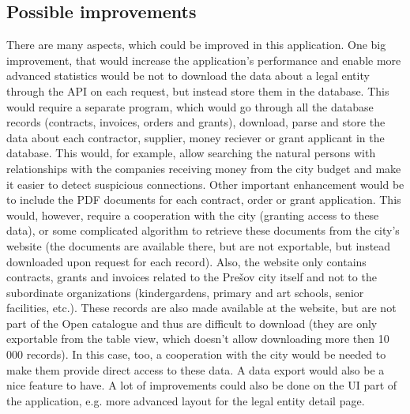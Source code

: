 \documentclass[thesis=B,english]{FITthesis}[2012/06/26]
\begin{document}
{	\subsection{Possible improvements}
	There are many aspects, which could be improved in this application. One big improvement, that would increase the application's performance and enable more advanced statistics would be not to download the data about a legal entity through the API on each request, but instead store them in the database. This would require a separate program, which would go through all the database records (contracts, invoices, orders and grants), download, parse and store the data about each contractor, supplier, money reciever or grant applicant in the database. This would, for example, allow searching the natural persons with relationships with the companies receiving money from the city budget and make it easier to detect suspicious connections. Other important enhancement would be to include the PDF documents for each contract, order or grant application. This would, however, require a cooperation with the city (granting access to these data), or some complicated algorithm to retrieve these documents from the city's website (the documents are available there, but are not exportable, but instead downloaded upon request for each record). Also, the website only contains contracts, grants and invoices related to the Prešov city itself and not to the subordinate organizations (kindergardens, primary and art schools, senior facilities, etc.). These records are also made available at the website, but are not part of the Open catalogue and thus are difficult to download (they are only exportable from the table view, which doesn't allow downloading more then 10 000 records). In this case, too, a cooperation with the city would be needed to make them provide direct access to these data. A data export would also be a nice feature to have. A lot of improvements could also be done on the UI part of the application, e.g. more advanced layout for the legal entity detail page.
\begin{conclusion}
\end{conclusion}

}
\end{document}
